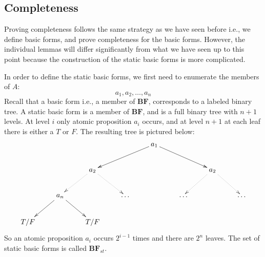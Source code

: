 \documentclass[a4paper,twoside,openright]{report}
\newcommand{\BF}{\ensuremath{\textbf{BF}}}
\begin{document}
\subsection{Completeness}
Proving completeness follows the same strategy as we have seen before i.e., we define basic forms, and prove completeness for the basic forms. However, the individual lemmas will differ significantly from what we have seen up to this point because the construction of the static basic forms is more complicated.  

In order to define the static basic forms, we first need to enumerate the members of $A$:
\[
a_1,a_2,\ldots,a_n
\]
Recall that a basic form i.e., a member of \BF, corresponds to a labeled binary tree. A static basic form is a member of \BF, and is a full binary tree with $n+1$ levels. At level $i$ only atomic proposition $a_i$ occurs, and at level $n+1$ at each leaf there is either a $T$ or $F$. The resulting tree is pictured below:
\[
\xymatrix{
&&&&a_1\ar[dll]\ar[drr]\\
&&a_2\ar@{.>}[dl]\ar@{.>}[dr]&&&&a_2\ar@{.>}[dl]\ar@{.>}[dr]\\
&a_n\ar[dl]\ar[dr] &&\ldots&&\ldots&&\ldots\\
T/F && T/F\\
}
\]
So an atomic proposition $a_i$ occurs $2^{i-1}$ times and there are $2^n$ leaves. The set of static basic forms is called $\BF_{st}$. 
\end{document}
